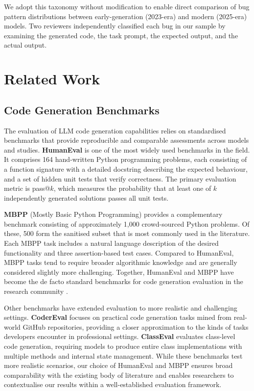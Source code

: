 \documentclass[smallextended]{svjour3}
\begin{document}
We adopt this taxonomy without modification to enable direct comparison of bug pattern distributions between early-generation (2023-era) and modern (2025-era) models. Two reviewers independently classified each bug in our sample by examining the generated code, the task prompt, the expected output, and the actual output.

\section{Related Work}
\label{sec:related_work}

\subsection{Code Generation Benchmarks}

The evaluation of LLM code generation capabilities relies on standardised benchmarks that provide reproducible and comparable assessments across models and studies. \textbf{HumanEval} \citep{chen2021evaluating} is one of the most widely used benchmarks in the field. It comprises 164 hand-written Python programming problems, each consisting of a function signature with a detailed docstring describing the expected behaviour, and a set of hidden unit tests that verify correctness. The primary evaluation metric is pass@$k$, which measures the probability that at least one of $k$ independently generated solutions passes all unit tests.

\textbf{MBPP} (Mostly Basic Python Programming) \citep{austin2021program} provides a complementary benchmark consisting of approximately 1,000 crowd-sourced Python problems. Of these, 500 form the sanitised subset that is most commonly used in the literature. Each MBPP task includes a natural language description of the desired functionality and three assertion-based test cases. Compared to HumanEval, MBPP tasks tend to require broader algorithmic knowledge and are generally considered slightly more challenging. Together, HumanEval and MBPP have become the de facto standard benchmarks for code generation evaluation in the research community \citep{evalplus2024, lu2024codeglue}.

Other benchmarks have extended evaluation to more realistic and challenging settings. \textbf{CoderEval} \citep{yu2023codereval} focuses on practical code generation tasks mined from real-world GitHub repositories, providing a closer approximation to the kinds of tasks developers encounter in professional settings. \textbf{ClassEval} \citep{du2023classeval} evaluates class-level code generation, requiring models to produce entire class implementations with multiple methods and internal state management. While these benchmarks test more realistic scenarios, our choice of HumanEval and MBPP ensures broad comparability with the existing body of literature and enables researchers to contextualise our results within a well-established evaluation framework.
\end{document}
